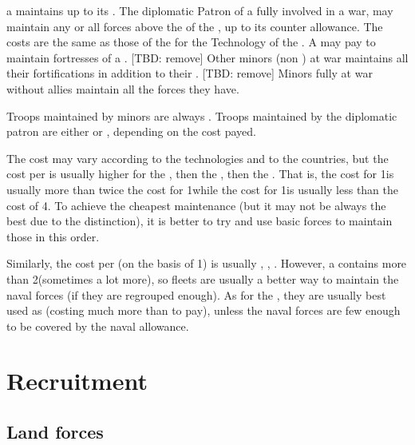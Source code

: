 \aparag[At war] a \MIN maintains up to its .
\bparag The diplomatic Patron of a \MIN fully involved in a war, may maintain
any or all forces above the  of the \MIN, up to its
counter allowance.
\bparag The costs are the same as those of the \MAJ for the Technology of the
\MIN.
\bparag A \MAJ may pay to maintain fortresses of a \VASSAL. [TBD: remove]
\bparag Other minors (non \VASSAL) at war maintains all their fortifications
in addition to their . [TBD: remove]
\bparag Minors fully at war without \MAJ allies maintain all the forces they
have.

\aparag[Moral] Troops maintained by minors are always .
\bparag Troops maintained by the diplomatic patron are either 
or , depending on the cost payed.

\begin{designnote} The cost may vary according to the
  technologies and to the countries, but the cost per \LD is usually higher
  for the \ARMY\facemoins, then the \LD, then the \ARMY\faceplus. That is, the
  cost for 1\ARMY\Facemoins is usually more than twice the cost for 1\LD while
  the cost for 1\ARMY\Faceplus is usually less than the cost of 4\LD. To
  achieve the cheapest maintenance (but it may not be always the best due to
  the  distinction), it is better to try and use basic forces
  to maintain those in this order.

  Similarly, the cost per \ND (on the basis of 1\FLEET{}\ND) is
  usually \FLEET\facemoins, \ND, \FLEET\faceplus. However, a \FLEET\facemoins
  contains more than 2\ND (sometimes a lot more), so fleets are usually a
  better way to maintain the naval forces (if they are regrouped enough). As
  for the \GD, they are usually best used as \ND (costing much more than \LD
  to pay), unless the naval forces are few enough to be covered by the naval
  allowance.
\end{designnote}





\section{Recruitment}\label{chLogistic:Recruitment}



\subsection{Land forces}


